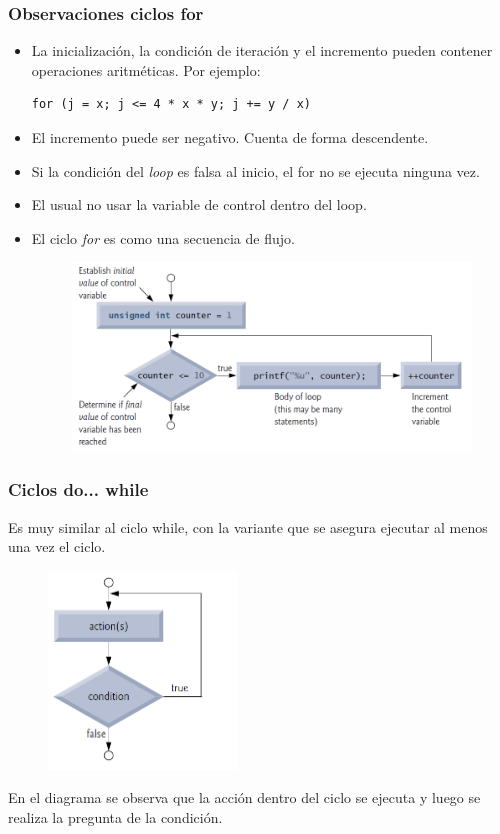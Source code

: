 \documentclass[10.5pt,scale=1.0,t,aspectratio=169,hyperref={pdfpagelabels=false}]{beamer}
\begin{document}
\begin{frame}[fragile]
	\frametitle{Observaciones ciclos for}
	\begin{itemize}
		\item La inicialización, la condición de iteración y el incremento pueden contener operaciones aritméticas. Por ejemplo:  
		\begin{lstlisting}[style=CStyle]
			for (j = x; j <= 4 * x * y; j += y / x)
		\end{lstlisting}
		\item El incremento puede ser negativo. Cuenta de forma descendente.
		\item Si la condición del \textit{loop} es falsa al inicio, el for no se ejecuta ninguna vez.
		\item El usual no usar la variable de control dentro del loop.
		\item El ciclo \textit{for} es como una secuencia de flujo. 
		\begin{figure}
			\centering
			\includegraphics[scale=0.5]{FlowchartFor}
		\end{figure}
	\end{itemize}
\end{frame}
\begin{frame}
	\frametitle{Ciclos do... while}
	Es muy similar al ciclo while, con la variante que se asegura ejecutar al menos una vez el ciclo. 
	\begin{figure}
		\centering
	\includegraphics[width=5cm]{DoWhile}
	\end{figure}
	En el diagrama se observa que la acción dentro del ciclo se ejecuta y luego se realiza la pregunta de la condición. 
\end{frame}
\end{document}
